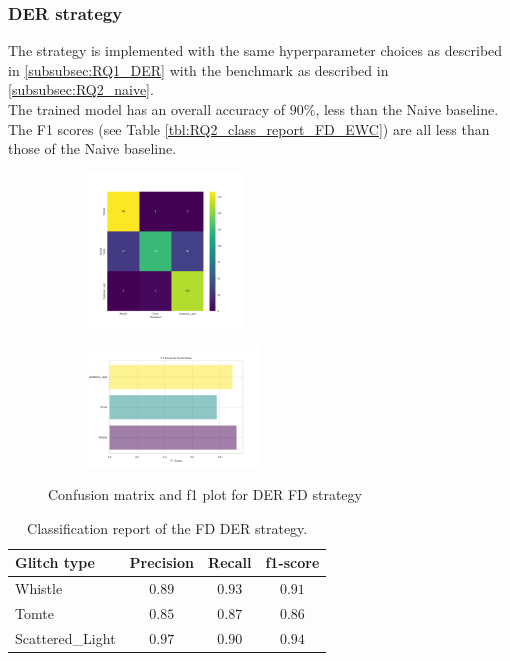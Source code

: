 \subsubsection{DER strategy}
\label{subsubsec:RQ2_der}
The strategy is implemented with the same hyperparameter choices as described in \ref{subsubsec:RQ1_DER} with the benchmark as described in \ref{subsubsec:RQ2_naive}. \\
The trained model has an overall accuracy of $90\%$, less than the Naive baseline. The F1 scores (see Table \ref{tbl:RQ2_class_report_FD_EWC}) are all less than those of the Naive baseline. 

\begin{figure}[!ht]
\centering
\begin{subfigure}
  \centering
  \includegraphics[width=0.45\textwidth]{Images/cm_FD_model_DER.png}  
  \label{fig:fd_sub-first8}
\end{subfigure}
\begin{subfigure}
  \centering
  \includegraphics[width=0.50\textwidth]{Images/f1_FD_model_DER.png}  
  \label{fig:fd_sub-second8}
\end{subfigure}
\caption{Confusion matrix and f1 plot for DER FD strategy}
\label{fig:cm_f1_FD_DER}
\end{figure}

\begin{table}[ht]
\centering
    \begin{tabular}{|l|c c c|}
    \hline
    \textbf{Glitch type} & \textbf{Precision} & \textbf{Recall} & \textbf{f1-score} \\ \hline
    Whistle & $0.89$ & $0.93$ & $0.91$ \\
    Tomte & $0.85$ & $0.87$ & $0.86$ \\
    Scattered\_Light & $0.97$ & $0.90$ & $0.94$ \\
    \hline
    \end{tabular}
    \caption{Classification report of the FD DER strategy.}
    \label{tbl:RQ2_class_report_FD_DER}
\end{table}

